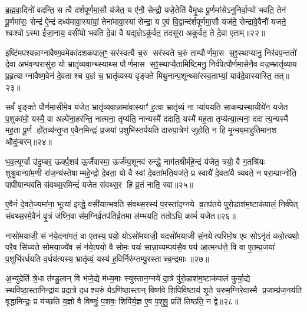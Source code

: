 {\anuvakamend[{दधि॑ मे ज॒घ्नुष॑ इन्द्रि॒यं वी॒र्य॑मित्य॑ब्रवीदे॒तद॑स्मा अव॒देय॑न्तनक्ति नो॒ द्विच॑त्वारिशच्च॥३॥}]}

ब्र॒ह्म॒वा॒दिनो॑ वदन्ति॒ स त्वै द॑र्शपूर्णमा॒सौ य॑जेत॒ य ए॑नौ॒ सेन्द्रौ॒ यजे॒तेति॑ वैमृ॒धः पू॒र्णमा॑सेऽनुनिर्वा॒प्यो॑ भवति॒ तेन॑ पू॒र्णमा॑सः॒ सेन्द्र॑ ऐ॒न्द्रं दध्य॑मावा॒स्या॑यां॒ तेना॑मावा॒स्या॑ सेन्द्रा॒ य ए॒वं वि॒द्वान्द॑र्शपूर्णमा॒सौ यज॑ते॒ सेन्द्रा॑वे॒वैनौ॑ यजते॒ श्वःश्वोऽस्मा ईजा॒नाय॒ वसी॑यो भवति दे॒वा वै यद्य॒ज्ञेऽकु॑र्वत॒ तदसु॑रा अकुर्वत॒ ते दे॒वा ए॒ताम्॥२२॥

इष्टि॑मपश्यन्नाग्नावैष्ण॒वमेका॑दशकपाल॒ꣳ॒ सर॑स्वत्यै च॒रु सर॑स्वते च॒रुं ताम्पौर्णमा॒स स॒ꣵ॒स्थाप्यानु॒ निर॑वप॒न्ततो॑ दे॒वा अभ॑व॒न्परासु॑रा॒ यो भ्रातृ॑व्यवा॒न्थ्स्याथ्स पौर्णमा॒स स॒ꣵ॒स्थाप्यै॒तामिष्टि॒मनु॒ निर्व॑पेत्पौर्णमा॒सेनै॒व वज्र॒म्भ्रातृ॑व्याय प्र॒हृत्याग्नावैष्ण॒वेन॑ दे॒वताश्च य॒ज्ञं च॒ भ्रातृ॑व्यस्य वृङ्क्ते मिथु॒नान्प॒शून्थ्सा॑रस्व॒ताभ्यां॒ याव॑दे॒वास्यास्ति॒ तत्॥२३॥

सर्वं॑ वृङ्क्ते पौर्णमा॒सीमे॒व य॑जेत॒ भ्रातृ॑व्यवा॒न्नामा॑वा॒स्याꣳ॑ ह॒त्वा भ्रातृ॑व्यं॒ ना प्या॑ययति साकम्प्रस्था॒यीये॑न यजेत प॒शुका॑मो॒ यस्मै॒ वा अल्पे॑ना॒हर॑न्ति॒ नात्मना॒ तृप्य॑ति॒ नान्यस्मै॑ ददाति॒ यस्मै॑ मह॒ता तृप्य॑त्या॒त्मना॒ ददात्य॒न्यस्मै॑ मह॒ता पू॒र्ण हो॑त॒व्य॑न्तृ॒प्त ए॒वैन॒मिन्द्रः॑ प्र॒जया॑ प॒शुभि॑स्तर्पयति दारुपा॒त्रेण॑ जुहोति॒ न हि मृ॒न्मय॒माहु॑तिमान॒श औदु॑म्बरम्॥२४॥

भ॒व॒त्यूर्ग्वा उ॑दु॒म्बर॒ ऊर्क्प॒शव॑ ऊ॒र्जैवास्मा॒ ऊर्ज॑म्प॒शूनव॑ रुन्द्धे॒ नाग॑तश्रीर्महे॒न्द्रं य॑जेत॒ त्रयो॒ वै ग॒तश्रि॑यः शुश्रु॒वान्ग्रा॑म॒णी रा॑ज॒न्य॑स्तेषाम्महे॒न्द्रो दे॒वता॒ यो वै स्वां दे॒वता॑मति॒यज॑ते॒ प्र स्वायै॑ दे॒वता॑यै च्यवते॒ न परा॒म्प्राप्नो॑ति॒ पापी॑यान्भवति संवथ्स॒रमिन्द्रं॑ यजेत संवथ्स॒र हि व्र॒तं नाति॒ स्वा॥२५॥

ए॒वैनं॑ दे॒वते॒ज्यमा॑ना॒ भूत्या॑ इन्द्धे॒ वसी॑यान्भवति संवथ्स॒रस्य॑ प॒रस्ता॑द॒ग्नये व्र॒तप॑तये पुरो॒डाश॑म॒ष्टाक॑पालं॒ निर्व॑पेत् संवथ्स॒रमे॒वैनं॑ वृ॒त्रं ज॑घ्नि॒वास॑म॒ग्निर्व्र॒तप॑तिर्व्र॒तमा ल॑म्भयति॒ ततोऽधि॒ कामं॑ यजेत॥२६॥

{\anuvakamend[{ए॒तान्तदौदु॑म्बर॒ꣵ॒ स्वा त्रि॒ꣳ॒शच्च॑॥४॥}]}

नासो॑मयाजी॒ सं न॑ये॒दना॑गतं॒ वा ए॒तस्य॒ पयो॒ योऽसो॑मयाजी॒ यदसो॑मयाजी सं॒नयेत्परिमो॒ष ए॒व सोऽनृ॑तं करो॒त्यथो॒ परै॒व सि॑च्यते सोमया॒ज्ये॑व सं न॑ये॒त्पयो॒ वै सोमः॒ पयः॑ सान्ना॒य्यम्पय॑सै॒व पय॑ आ॒त्मन्ध॑त्ते॒ वि वा ए॒तम्प्र॒जया॑ प॒शुभि॑रर्धयति व॒र्धय॑त्यस्य॒ भ्रातृ॑व्यं॒ यस्य॑ ह॒विर्निरु॑प्तम्पु॒रस्ताच्च॒न्द्रमाः॥२७॥

अ॒भ्यु॑देति॑ त्रे॒धा त॑ण्डु॒लान् वि भ॑जे॒द्ये म॑ध्य॒माः स्युस्तान॒ग्नये॑ दा॒त्रे पु॑रो॒डाश॑म॒ष्टाक॑पालं कुर्या॒द्ये स्थवि॑ष्ठा॒स्तानिन्द्रा॑य प्रदा॒त्रे द॒धश्च॒रुं येऽणि॑ष्ठा॒स्तान् विष्ण॑वे शिपिवि॒ष्टाय॑ शृ॒ते च॒रुम॒ग्निरे॒वास्मै प्र॒जाम्प्र॑ज॒नय॑ति वृ॒द्धामिन्द्रः॒ प्र य॑च्छति य॒ज्ञो वै विष्णुः॑ प॒शवः॒ शिपि॑र्य॒ज्ञ ए॒व प॒शुषु॒ प्रति॑ तिष्ठति॒ न द्वे॥२८॥

